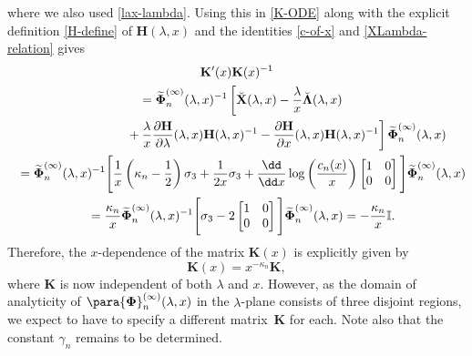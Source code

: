 where we also used \eqref{lax-lambda}.
Using this in \eqref{K-ODE} along with the explicit definition \eqref{H-define} of $\mathbf{H}(\lambda,x)$ and the identities \eqref{c-of-x} and \eqref{XLambda-relation} gives
\begin{gather*}
 \mathbf{K}'(x)\mathbf{K}(x)^{-1}\\
\quad =\widetilde{\boldsymbol{\Phi}}_n^{(\infty)}(\lambda,x)^{-1}\left[\breve{\mathbf{X}}(\lambda,x)-\frac{\lambda}{x}\breve{\boldsymbol{\Lambda}}(\lambda,x)
\right.\\
\left.
\hphantom{\quad =\widetilde{\boldsymbol{\Phi}}_n^{(\infty)}(\lambda,x)^{-1}}{}
+\frac{\lambda}{x}\frac{\partial\mathbf{H}}{\partial\lambda}(\lambda,x)\mathbf{H}(\lambda,x)^{-1}-\frac{\partial\mathbf{H}}{\partial x}(\lambda,x)\mathbf{H}(\lambda,x)^{-1}\right]\widetilde{\boldsymbol{\Phi}}_n^{(\infty)}(\lambda,x)\\
 \quad =\widetilde{\boldsymbol\Phi}_n^{(\infty)}(\lambda,x)^{-1}\Bigg[\frac{1}{x}\left(\kappa_n-\frac{1}{2}\right)\sigma_3 +\frac{1}{2x}\sigma_3+\frac{\dd}{\dd x}\log\left(\frac{c_n(x)}{x}\right)\begin{bmatrix}1&0\\0&0\end{bmatrix}\Bigg]\widetilde{\boldsymbol{\Phi}}_n^{(\infty)}(\lambda,x)\\
 \quad=\frac{\kappa_n}{x}\widetilde{\boldsymbol{\Phi}}_n^{(\infty)}(\lambda,x)^{-1}\Bigg[\sigma_3-2
 \begin{bmatrix}1&0\\0&0\end{bmatrix}\Bigg]\widetilde{\boldsymbol{\Phi}}_n^{(\infty)}(\lambda,x)
=-\frac{\kappa_n}{x}\mathbb{I}.
\end{gather*}
Therefore, the $x$-dependence of the matrix $\mathbf{K}(x)$ is explicitly given by
\begin{equation*}
 \mathbf{K}(x)=x^{-\kappa_n}\mathbf{K},
\end{equation*}
where $\mathbf{K}$ is now independent of both $\lambda$ and $x$. However, as the domain of analyticity of $\para{\mathbf{\Phi}}_n^{(\infty)}(\lambda,x)$ in the $\lambda$-plane consists of three disjoint regions, we expect to have to specify a different matrix~$\mathbf{K}$ for each. Note also that the constant $\gamma_n$ remains to be determined.

